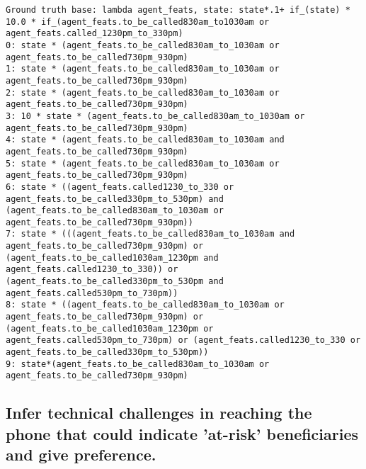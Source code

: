 \begin{lstlisting}
Ground truth base: lambda agent_feats, state: state*.1+ if_(state) * 10.0 * if_(agent_feats.to_be_called830am_to1030am or agent_feats.called_1230pm_to_330pm)
0: state * (agent_feats.to_be_called830am_to_1030am or agent_feats.to_be_called730pm_930pm) 
1: state * (agent_feats.to_be_called830am_to_1030am or agent_feats.to_be_called730pm_930pm) 
2: state * (agent_feats.to_be_called830am_to_1030am or agent_feats.to_be_called730pm_930pm) 
3: 10 * state * (agent_feats.to_be_called830am_to_1030am or agent_feats.to_be_called730pm_930pm) 
4: state * (agent_feats.to_be_called830am_to_1030am and agent_feats.to_be_called730pm_930pm) 
5: state * (agent_feats.to_be_called830am_to_1030am or agent_feats.to_be_called730pm_930pm) 
6: state * ((agent_feats.called1230_to_330 or agent_feats.to_be_called330pm_to_530pm) and (agent_feats.to_be_called830am_to_1030am or agent_feats.to_be_called730pm_930pm)) 
7: state * (((agent_feats.to_be_called830am_to_1030am and agent_feats.to_be_called730pm_930pm) or (agent_feats.to_be_called1030am_1230pm and agent_feats.called1230_to_330)) or (agent_feats.to_be_called330pm_to_530pm and agent_feats.called530pm_to_730pm)) 
8: state * ((agent_feats.to_be_called830am_to_1030am or agent_feats.to_be_called730pm_930pm) or (agent_feats.to_be_called1030am_1230pm or agent_feats.called530pm_to_730pm) or (agent_feats.called1230_to_330 or agent_feats.to_be_called330pm_to_530pm)) 
9: state*(agent_feats.to_be_called830am_to_1030am or agent_feats.to_be_called730pm_930pm) 

\end{lstlisting}
\subsection{Infer technical challenges in reaching the phone that could indicate 'at-risk' beneficiaries and give preference.}


